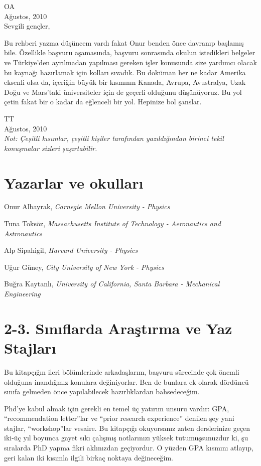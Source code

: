 \documentclass[12pt]{article}
\begin{document}
\noindent OA \\
Ağustos, 2010 \\

\noindent Sevgili gençler, 

Bu rehberi yazma düşüncem vardı fakat Onur benden önce davranıp başlamış bile. Özellikle başvuru aşamasında, başvuru sonrasında okulun istedikleri belgeler ve Türkiye'den ayrılmadan yapılması gereken işler konusunda size yardımcı olacak bu kaynağı hazırlamak için kolları sıvadık. Bu doküman her ne kadar Amerika eksenli olsa da, içeriğin büyük bir kısmının Kanada, Avrupa, Avustralya, Uzak Doğu ve Mars'taki üniversiteler için de geçerli olduğunu düşünüyoruz. Bu yol çetin fakat bir o kadar da eğlenceli bir yol. Hepinize bol şanslar.   

\noindent TT \\
Ağustos, 2010 \\

\textit{Not: Çeşitli kısımlar, çeşitli kişiler tarafından yazıldığından birinci tekil konuşmalar sizleri şaşırtabilir. 
}

\newpage
%
%
%
\section*{Yazarlar ve okulları}

Onur Albayrak, \textit{Carnegie Mellon University - Physics }

Tuna Toksöz, \textit{Massachusetts Institute of Technology - Aeronautics and \\ Astronautics }

Alp Sipahigil, \textit{Harvard University - Physics }

Uğur Güney, \textit{City University of New York - Physics }

Buğra Kaytanlı, \textit{University of California, Santa Barbara - Mechanical \\ Engineering}
\newpage
%
%
\section{2-3. Sınıflarda Araştırma ve Yaz Stajları}
Bu kitapçığın ileri bölümlerinde arkadaşlarım, başvuru sürecinde çok önemli olduğuna inandığmız konulara değiniyorlar. Ben de bunlara ek olarak dördüncü sınıfa gelmeden önce yapılabilecek hazırlıklardan bahsedeceğim.

Phd’ye kabul almak için gerekli en temel üç yatırım unsuru vardır: GPA, “recommendation letter”lar ve “prior research experience” denilen şey yani stajlar, “workshop”lar vesaire. Bu kitapçığı okuyorsanız zaten derslerinize geçen iki-üç yıl boyunca gayet sıkı çalışmış notlarınızı yüksek tutumuşsunuzdur ki, şu sıralarda  PhD yapma fikri aklınızdan geçiyordur. O yüzden GPA kısmını atlayıp, geri kalan iki kısımla ilgili birkaç noktaya değineceğim.
\end{document}

